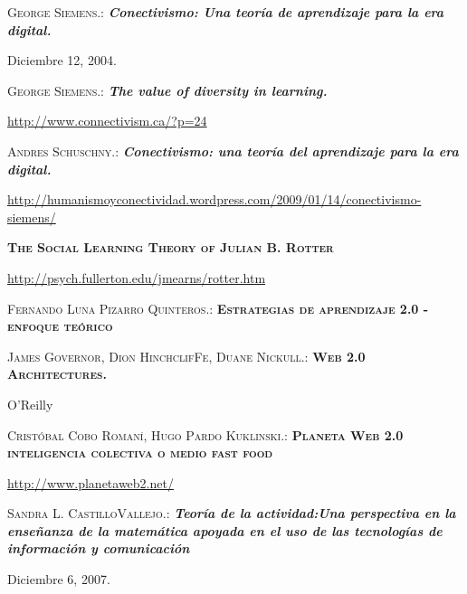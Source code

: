 \newpage
\begin{thebibliography}{99}
  \textsc{George Siemens.:}
              \textit{\textbf{Conectivismo: Una teor\'ia de aprendizaje para la era digital.}}
              \par Diciembre 12, 2004.

  \textsc{George Siemens.:}
            \textit{\textbf{The value of diversity in learning.}}
            \par \url{http://www.connectivism.ca/?p=24}

  \textsc{Andres Schuschny.:}
             \textit{\textbf{Conectivismo: una teor\'ia del aprendizaje para la era digital.}}
             \par \url{http://humanismoyconectividad.wordpress.com/2009/01/14/conectivismo-siemens/}

  \textsc{\textbf{The Social Learning Theory of Julian B. Rotter}}
                 \par \url{http://psych.fullerton.edu/jmearns/rotter.htm}
 
  \textsc{Fernando Luna Pizarro Quinteros.:}
                       \textsc{\textbf{Estrategias de aprendizaje 2.0 - enfoque te\'orico}}

  \textsc{James Governor, Dion HinchclifFe, Duane Nickull.:}
               \textsc{\textbf{ Web 2.0 Architectures.}}
               \par O'Reilly
                                       
  \textsc{Crist\'obal Cobo Roman\'i, Hugo Pardo Kuklinski.:}
                  \textsc{\textbf{Planeta Web 2.0 inteligencia colectiva o medio fast food}}
                  \par \url{http://www.planetaweb2.net/}                   

  \textsc{Sandra L. CastilloVallejo.:}
               \textit{\textbf{Teor\'ia de la actividad:Una perspectiva en la ense\~nanza de la matem\'atica apoyada en el
                               uso de las tecnolog\'ias de informaci\'on y comunicaci\'on}}
               \par Diciembre 6, 2007.
  

\end{thebibliography}

